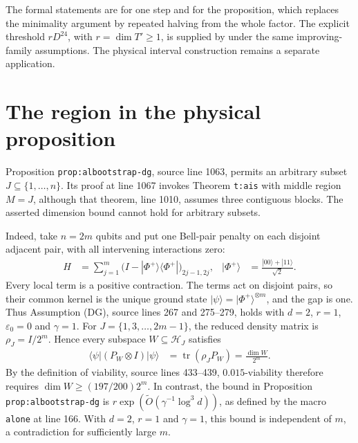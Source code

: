 \documentclass{article}
\begin{document}
The formal statements are
 for one step and
 for the
proposition, which replaces the minimality argument by repeated halving
from the whole factor. The explicit threshold $rD^{24}$, with
$r=\dim T'\ge1$, is supplied by
 under the same
improving-family assumptions. The physical interval construction remains
a separate application.

\section{The region in the physical proposition}

Proposition \texttt{prop:albootstrap-dg}, source line 1063, permits an
arbitrary subset $J\subseteq\{1,\ldots,n\}$. Its proof at line 1067 invokes
Theorem \texttt{t:ais} with middle region $M=J$, although that theorem,
line 1010, assumes three contiguous blocks. The asserted dimension bound
cannot hold for arbitrary subsets.

Indeed, take $n=2m$ qubits and put one Bell-pair penalty on each disjoint
adjacent pair, with all intervening interactions zero:
\begin{align}
    H&=\sum_{j=1}^m\bigl(I-|\Phi^+\rangle\langle\Phi^+|\bigr)_{2j-1,2j},
    &|\Phi^+\rangle&=\frac{|00\rangle+|11\rangle}{\sqrt2}.
    \label{eq:bootstrap_disconnected_bell_hamiltonian}
\end{align}
Every local term is a positive contraction. The terms act on disjoint
pairs, so their common kernel is the unique ground state
$|\psi\rangle=|\Phi^+\rangle^{\otimes m}$, and the gap is one.
Thus Assumption (DG), source lines 267 and 275--279, holds with
$d=2$, $r=1$, $\varepsilon_0=0$ and $\gamma=1$.
For $J=\{1,3,\ldots,2m-1\}$, the reduced density matrix is
$\rho_J=I/2^m$. Hence every subspace $W\subseteq\mathcal H_J$ satisfies
\begin{align}
    \langle\psi|(P_W\otimes I)|\psi\rangle
    &=\operatorname{tr}(\rho_JP_W)=\frac{\dim W}{2^m}.
    \label{eq:bootstrap_disconnected_bell_overlap}
\end{align}
By the definition of viability, source lines 433--439, $0.015$-viability
therefore requires $\dim W\ge(197/200)2^m$. In contrast, the bound in
Proposition \texttt{prop:albootstrap-dg} is
$r\exp(\widetilde O(\gamma^{-1}\log^3d))$, as defined by the macro
\texttt{alone} at line 166. With $d=2$, $r=1$ and $\gamma=1$, this bound
is independent of $m$, a contradiction for sufficiently large $m$.
\end{document}
